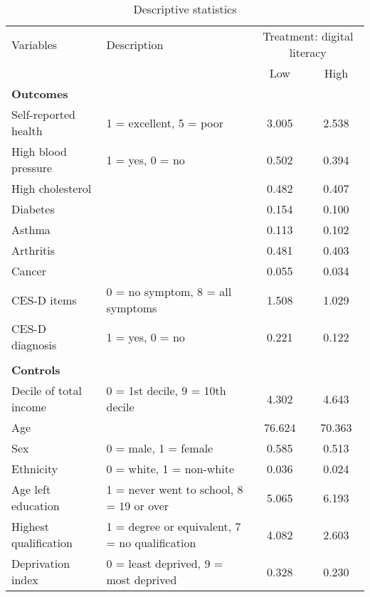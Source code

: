 \documentclass[12pt]{article}
\begin{document}
    \begin{sidewaystable}[h!]
        \centering
        \caption{Descriptive statistics}
        \label{tab:desc_stats_q1}
        \begin{tabular}{llcc}
            \toprule
            Variables & Description & \multicolumn{2}{c}{Treatment: digital literacy} \\
            & & Low & High \\
            \midrule
            \textbf{Outcomes} & & & \\
            Self-reported health & 1 = excellent, 5 = poor & 3.005 & 2.538 \\
            High blood pressure & 1 = yes, 0 = no & 0.502 & 0.394 \\
            High cholesterol &  & 0.482 & 0.407 \\
            Diabetes &  & 0.154 & 0.100 \\
            Asthma &  & 0.113 & 0.102 \\
            Arthritis &  & 0.481 & 0.403 \\
            Cancer &  & 0.055 & 0.034 \\
            CES-D items & 0 = no symptom, 8 = all symptoms & 1.508 & 1.029 \\
            CES-D diagnosis & 1 = yes, 0 = no & 0.221 & 0.122 \\
            & & & \\
            \textbf{Controls} & & & \\
            Decile of total income & 0 = 1st decile, 9 = 10th decile & 4.302 & 4.643 \\
            Age &  & 76.624 & 70.363 \\
            Sex & 0 = male, 1 = female & 0.585 & 0.513 \\
            Ethnicity & 0 = white, 1 = non-white & 0.036 & 0.024 \\
            Age left education & 1 = never went to school, 8 = 19 or over & 5.065 & 6.193 \\
            Highest qualification & 1 = degree or equivalent, 7 = no qualification & 4.082 & 2.603 \\
            Deprivation index & 0 = least deprived, 9 = most deprived & 0.328 & 0.230 \\
            \bottomrule
        \end{tabular}
    \end{sidewaystable}
\end{document}
